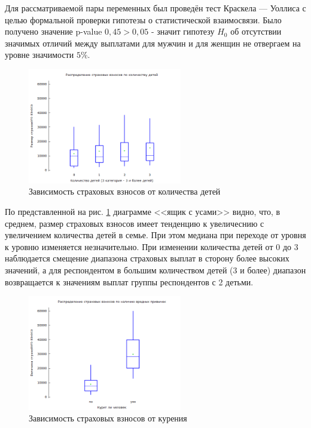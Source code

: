 \documentclass[a4paper,12pt]{article}
\begin{document}
Для рассматриваемой пары переменных был проведён тест Краскела — Уоллиса с целью формальной проверки гипотезы о статистической взаимосвязи. Было получено значение p-value $0,45 > 0,05$ - значит гипотезу $H_0$ об отсутствии значимых отличий между выплатами для мужчин и для женщин не отвергаем на уровне значимости $5\%$.

\begin{figure}[H]
	\includegraphics[width=0.6\textwidth]{../[graphics]/charges-children_agr.png}
	\centering
	\caption{Зависимость страховых взносов от количества детей}
	\label{fig:charges-children_agr}
\end{figure}

По представленной на рис. \ref{fig:charges-children_agr} диаграмме <<ящик с усами>> видно, что, в среднем, размер страховых взносов имеет тенденцию к увеличеснию с увеличением количества детей в семье. При этом медиана при переходе от уровня к уровню изменяется незначительно. При изменении количества детей от 0 до 3 наблюдается смещение диапазона страховых выплат в сторону более высоких значений, а для респондентом в большим количеством детей (3 и более) диапазон возвращается к значениям выплат группы респондентов с 2 детьми.

\begin{figure}[H]
	\includegraphics[width=0.6\textwidth]{../[graphics]/charges-smoker.png}
	\centering
	\caption{Зависимость страховых взносов от курения}
	\label{fig:charges-smoker}
\end{figure}
\end{document}
